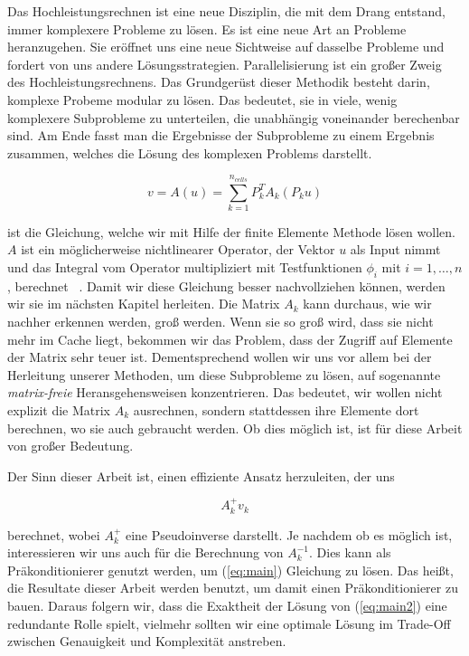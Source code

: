 Das Hochleistungsrechnen ist eine neue Disziplin, die mit dem Drang entstand, immer komplexere Probleme zu lösen. Es ist eine neue Art an Probleme heranzugehen. Sie eröffnet uns eine neue Sichtweise auf dasselbe Probleme und fordert von uns andere Lösungsstrategien.
Parallelisierung ist ein großer Zweig des Hochleistungsrechnens. Das Grundgerüst dieser Methodik besteht darin, komplexe Probeme modular zu lösen. Das bedeutet, sie in viele, wenig komplexere Subprobleme zu unterteilen, die unabhängig voneinander berechenbar sind. Am Ende fasst man die Ergebnisse der Subprobleme zu einem Ergebnis zusammen, welches die Lösung des komplexen Problems darstellt.

\begin{equation} \label{eq:main}
v=A(u)=\sum_{k=1}^{n_{cells}}  P_k^T A_k (P_k u)
\end{equation}

ist die Gleichung, welche wir mit Hilfe der finite Elemente Methode lösen wollen. $A$ ist ein möglicherweise nichtlinearer Operator, der Vektor $u$ als Input nimmt und das Integral vom Operator multipliziert mit  Testfunktionen $\phi_i$ mit $i=1,\dots,n$, berechnet ~\cite[136]{Kronbichler}. Damit wir diese Gleichung besser nachvollziehen können, werden wir sie im nächsten Kapitel herleiten. 
Die Matrix $A_k$ kann durchaus, wie wir nachher erkennen werden, groß werden. Wenn sie so groß wird, dass sie nicht mehr im Cache liegt, bekommen wir das Problem, dass der Zugriff auf Elemente der Matrix sehr teuer ist. Dementsprechend wollen wir uns vor allem bei der Herleitung unserer Methoden, um diese Subprobleme zu lösen, auf sogenannte \textit{matrix-freie} Heransgehensweisen konzentrieren. Das bedeutet, wir wollen nicht explizit die Matrix $A_k$ ausrechnen, sondern stattdessen ihre Elemente dort berechnen, wo sie auch gebraucht werden. Ob dies möglich ist, ist für diese Arbeit von großer Bedeutung. 

Der Sinn dieser Arbeit ist, einen effiziente Ansatz herzuleiten, der uns 

\begin{equation} \label{eq:main2}
A_k^{+}v_k
\end{equation}

berechnet, wobei $A_k^{+}$ eine Pseudoinverse darstellt. Je nachdem ob es möglich ist, interessieren wir uns auch für die Berechnung von $A_k^{-1}$. Dies kann als Präkonditionierer genutzt werden, um (\ref{eq:main}) Gleichung zu lösen. Das heißt, die Resultate dieser Arbeit werden benutzt, um damit einen Präkonditionierer zu bauen. Daraus folgern wir, dass die Exaktheit der Lösung von (\ref{eq:main2}) eine redundante Rolle spielt, vielmehr sollten wir eine optimale Lösung im Trade-Off zwischen Genauigkeit und Komplexität anstreben.

